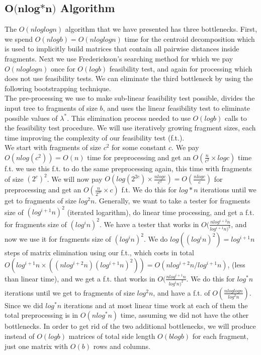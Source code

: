 \documentclass[11pt,a4paper]{article}
\theoremstyle{definition}
\theoremstyle{remark}
\begin{document}
\subsection{$\textbf{O(nlog*n)}$ Algorithm}
The $O(nloglogn)$ algorithm that we have presented has three bottlenecks. First, we spend $O(nlogb)=O(nloglogn)$ time for the centroid decomposition which is used to implicitly build matrices that contain all pairwise distances inside fragments. Next we use Frederickson's searching method for which we pay $O(nloglogn)$ once for $O(logb)$ feasibility test, and again for processing which does not use feasibility tests. We can eliminate the third bottleneck by using the following bootstrapping technique.\\
The  pre-processing we use to make sub-linear feasibility test possible, divides the input tree to fragments of size $b$, and uses the linear feasibility test to eliminate possible values of $\lambda^*$. This elimination process needed to use $O(logb)$ calls to the feasibility test procedure.
We will use iteratively growing fragment sizes, each time improving the complexity of our feasibility test (f.t.).\\
We start with fragments of size $c^2$ for some constant $c$.
We pay $O(nlog(c^2)) = O(n)$ time for preprocessing and get an $O(\frac{n}{c^2} \times logc)$ time f.t.
we use this f.t. to do the same preprocessing again, this time with fragments of size $(2^c)^2$.
We will now pay $O(log(2^{2c}) \times \frac{nlogc}{c^2})= O(\frac{nlogc}{c})$ for preprocessing and get an $O(\frac{n}{2^{2c}} \times c)$ f.t.
We do this for $log*n$ iterations until we get to fragments of size $log^2n$.
Generally, we want to take a tester for fragments size of $(log^{i+1}n)^2$ (iterated logarithm), do linear time processing, and get a f.t. for fragments size of $(log^in)^2$. We have a tester that works in $O(\frac{nlog^{i+2}n}{log^{i+1}n)^2}$, and now we use it for fragments size of $(log^in)^2$. We do $log((log^in)^2) = log^{i+1}n$   steps of matrix elimination using our f.t., which costs in total $O(log^{i+1}n \times ((nlog^{i+2}n)(log^{i+1}n)^2)) = O(nlog^{i+2}n/log^{i+1}n)$, (less than linear time), and we get a f.t. that works in $O(\frac{nlog^{i+1}n}{log^in)^2}$.
We do this for $log^*n$ iterations until we get to fragments of size $log^2n$, and have a f.t. of $O(\frac{nloglogn}{log^2n})$. Since we did $log^*n$ iterations and at most linear time work at each of them the total preprocessing is in $O(nlog^*n)$ time, assuming we did not have the other bottlenecks.
In order to get rid of the two additional bottlenecks, we will produce instead of $O(logb)$ matrices of total side length $O(blogb)$ for each fragment, just one matrix with $O(b)$ rows and columns.




\end{document}
